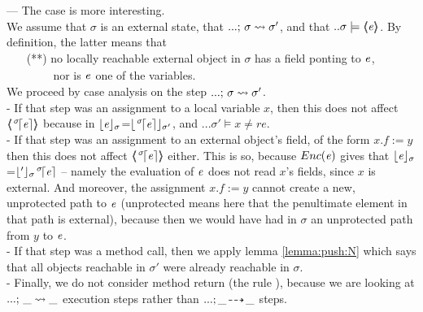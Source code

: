 \noindent 
--- The case {} is more interesting. \\
We assume that $\sigma$ is an external state,   that $...;\, {\sigma} \rightsquigarrow \sigma'$, and that $.. \sigma \models \langle\!\!\langle \mathit{e} \rangle\!\!\rangle$.
By definition, the latter means that\\
 $\strut \ \ \ \ $  (**) no locally reachable external object in $\sigma$ has a field ponting to $\mathit{e}$, \\
 $\strut \ \ \ \ \ \ \ \ \ \ \ $ nor is $\mathit{e}$ one of the variables.\\
We proceed by case analysis on the step $...;\, {\sigma} \rightsquigarrow \sigma'$.
\\
- If that step was an assignment to a local variable $x$, then this does not affect $\langle\!\!\langle ^{\,\sigma}\!\lceil \mathit{e} \rceil \rangle\!\!\rangle$ because in $\lfloor \mathit{e} \rfloor_{\sigma}$=$\lfloor ^{\,\sigma}\!\lceil \mathit{e} \rceil \rfloor_{\sigma'}$,
and $... \sigma' \models x \neq re$.
\\
- If that step was an assignment to an external object's field, of the form $x.f :=y$ then this does not affect $\langle\!\!\langle ^{\,\sigma}\!\lceil \mathit{e} \rceil \rangle\!\!\rangle$ either.
This is so, because ${Enc( \mathit{e} )}$ gives that $\lfloor \mathit{e} \rfloor_{\sigma}$=$\lfloor ' \rfloor_{\sigma} {^{\,\sigma}\!\lceil \mathit{e} \rceil}$ -- namely the evaluation of $\mathit{e}$ does not read $x$'s fields, since $x$ is external. 
And moreover, the assignment $x.f :=y$ cannot create a new, unprotected  path to $\mathit{e}$ (unprotected means here that the penultimate element in that path is external), because then we would have had in $\sigma$  an unprotected path from $y$ to $\mathit{e}$.
\\
- If that step was a method call, then we apply lemma \ref{lemma:push:N} which says that all objects reachable in $\sigma'$ were already reachable in $\sigma$.
\\
- Finally, we do not consider method return (\ie the rule {}),   because we are looking at $...;\, {\_} \rightsquigarrow \_$ execution steps rather than $...;\_\! \dashrightarrow\! {\_}$ steps.
\hspace{3cm}
\completeProof

 


